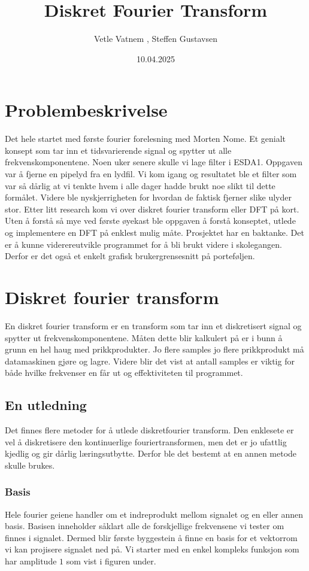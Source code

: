 \documentclass{article}
\title{Diskret Fourier Transform}
\author{Vetle Vatnem , Steffen Gustavsen}
\date{10.04.2025}
\begin{document}
    \maketitle
    \tableofcontents
    \clearpage

\section{Problembeskrivelse}
    Det hele startet med første fourier forelesning med Morten Nome. 
    Et genialt konsept som tar inn et tidsvarierende signal og spytter ut alle frekvenskomponentene.
    Noen uker senere skulle vi lage filter i ESDA1. 
    Oppgaven var å fjerne en pipelyd fra en lydfil.
    Vi kom igang og resultatet ble et filter som var så dårlig at vi tenkte hvem i alle dager hadde brukt noe slikt til dette formålet.
    Videre ble nyskjerrigheten for hvordan de faktisk fjerner slike ulyder stor.
    Etter litt research kom vi over diskret fourier transform eller DFT på kort.
    Uten å forstå så mye ved første øyekast ble oppgaven å forstå konseptet, utlede og implementere en DFT på enklest mulig måte.
    Prosjektet har en baktanke. Det er å kunne viderereutvikle programmet for å bli brukt videre i skolegangen.
    Derfor er det også et enkelt grafisk brukergrensesnitt på porteføljen.

\section{Diskret fourier transform}
    En diskret fourier transform er en transform som tar inn et diskretisert signal og spytter ut frekvenskomponentene.
    Måten dette blir kalkulert på er i bunn å grunn en hel haug med prikkprodukter. Jo flere samples jo flere prikkprodukt må datamaskinen gjøre og lagre.
    Videre blir det vist at antall samples er viktig for både hvilke frekvenser en får ut og effektiviteten til programmet.
    
    \subsection{En utledning}
        Det finnes flere metoder for å utlede diskretfourier transform. 
        Den enklesete er vel å diskretisere den kontinuerlige fouriertransformen, men det er jo ufattlig kjedlig og gir dårlig læringsutbytte.
        Derfor ble det bestemt at en annen metode skulle brukes.

        \subsubsection{Basis}
            Hele fourier geiene handler om et indreprodukt mellom signalet og en eller annen basis.
            Basisen inneholder såklart alle de forskjellige frekvensene vi tester om finnes i signalet.
            Dermed blir første byggestein å finne en basis for et vektorrom vi kan projisere signalet ned på.
            Vi starter med en enkel kompleks funksjon som har amplitude \(1\) som vist i figuren under.
\end{document}
